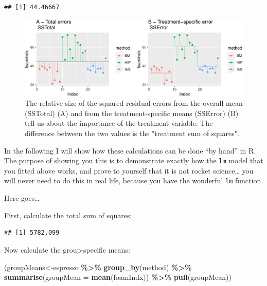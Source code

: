 \documentclass[
  a4paperpaper,
]{book}
\newenvironment{Shaded}{\begin{snugshade}}{\end{snugshade}}
\newcommand{\DataTypeTok}[1]{\textcolor[rgb]{0.13,0.29,0.53}{#1}}
\newcommand{\DecValTok}[1]{\textcolor[rgb]{0.00,0.00,0.81}{#1}}
\newcommand{\KeywordTok}[1]{\textcolor[rgb]{0.13,0.29,0.53}{\textbf{#1}}}
\newcommand{\NormalTok}[1]{#1}
\newcommand{\OperatorTok}[1]{\textcolor[rgb]{0.81,0.36,0.00}{\textbf{#1}}}
\begin{document}
\begin{verbatim}
## [1] 44.46667
\end{verbatim}

\begin{figure}[ht]

{\centering \includegraphics{BB852_files/figure-latex/ANOVAbyhand-1} 

}

\caption{The relative size of the squared residual errors from the overall mean (SSTotal) (A) and from the treatment-specific means (SSError) (B) tell us about the importance of the treatment variable. The difference between the two values is the "treatment sum of squares".}\label{fig:ANOVAbyhand}
\end{figure}

In the following I will show how these calculations can be done ``by hand'' in R. The purpose of showing you this is to demonstrate exactly how the \texttt{lm} model that you fitted above works, and prove to yourself that it is not rocket science\ldots{} you will never need to do this in real life, because you have the wonderful \texttt{lm} function.

Here goes\ldots{}

First, calculate the total sum of squares:

\begin{Shaded}
\end{Shaded}

\begin{verbatim}
## [1] 5782.099
\end{verbatim}

Now calculate the group-specific means:

\begin{Shaded}
\begin{Highlighting}[]
\NormalTok{(groupMeans\textless{}{-}espresso }\OperatorTok{\%\textgreater{}\%}
\KeywordTok{group\_by}\NormalTok{(method) }\OperatorTok{\%\textgreater{}\%}
\KeywordTok{summarise}\NormalTok{(}\DataTypeTok{groupMean =} \KeywordTok{mean}\NormalTok{(foamIndx)) }\OperatorTok{\%\textgreater{}\%}
\KeywordTok{pull}\NormalTok{(groupMean))}
\end{Highlighting}
\end{Shaded}
\end{document}
